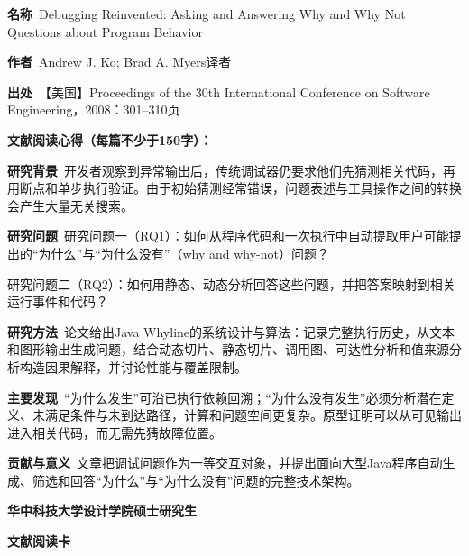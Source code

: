 \vspace{0.25em}
\noindent\underline{}\par
\vspace{0.35em}
\noindent\textbf{名称}\ Debugging Reinvented: Asking and Answering Why and Why Not Questions about Program Behavior\par
\noindent\textbf{作者}\ Andrew J. Ko; Brad A. Myers\quad 译者\par
\noindent\textbf{出处}\ 【美国】Proceedings of the 30th International Conference on Software Engineering，2008：301–310\quad 页\par
\vspace{0.35em}
\noindent\textbf{文献阅读心得（每篇不少于150字）：}\par
\noindent\textbf{研究背景}\ 开发者观察到异常输出后，传统调试器仍要求他们先猜测相关代码，再用断点和单步执行验证。由于初始猜测经常错误，问题表述与工具操作之间的转换会产生大量无关搜索。\par
\noindent\textbf{研究问题}\ 研究问题一（RQ1）：如何从程序代码和一次执行中自动提取用户可能提出的“为什么”与“为什么没有”（why and why-not）问题？\par
研究问题二（RQ2）：如何用静态、动态分析回答这些问题，并把答案映射到相关运行事件和代码？\par
\noindent\textbf{研究方法}\ 论文给出Java Whyline的系统设计与算法：记录完整执行历史，从文本和图形输出生成问题，结合动态切片、静态切片、调用图、可达性分析和值来源分析构造因果解释，并讨论性能与覆盖限制。\par
\noindent\textbf{主要发现}\ “为什么发生”可沿已执行依赖回溯；“为什么没有发生”必须分析潜在定义、未满足条件与未到达路径，计算和问题空间更复杂。原型证明可以从可见输出进入相关代码，而无需先猜故障位置。\par
\noindent\textbf{贡献与意义}\ 文章把调试问题作为一等交互对象，并提出面向大型Java程序自动生成、筛选和回答“为什么”与“为什么没有”问题的完整技术架构。\par
\clearpage
\begin{center}
{\songti\bfseries\fontsize{18.5pt}{27.75pt}\selectfont 华中科技大学设计学院硕士研究生\par}
{\songti\bfseries\fontsize{18.5pt}{27.75pt}\selectfont 文献阅读卡\par}
\end{center}
\vspace{0.25em}
\noindent\underline{}\par
